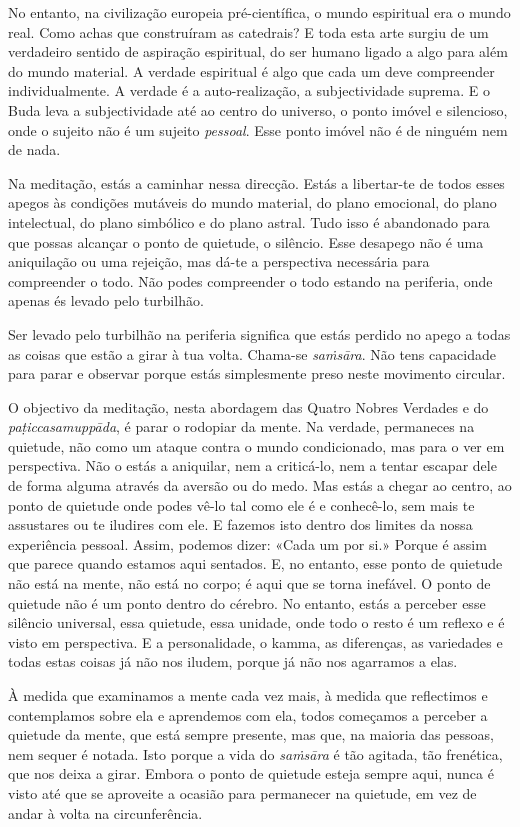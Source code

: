 No entanto, na civilização europeia pré-científica, o mundo espiritual era o
mundo real. Como achas que construíram as catedrais? E toda esta arte surgiu de
um verdadeiro sentido de aspiração espiritual, do ser humano ligado a algo para
além do mundo material. A verdade espiritual é algo que cada um deve compreender
individualmente. A verdade é a auto-realização, a subjectividade suprema. E o
Buda leva a subjectividade até ao centro do universo, o ponto imóvel e
silencioso, onde o sujeito não é um sujeito \emph{pessoal}. Esse ponto imóvel
não é de ninguém nem de nada.

Na meditação, estás a caminhar nessa direcção. Estás a libertar-te de todos
esses apegos às condições mutáveis do mundo material, do plano emocional, do
plano intelectual, do plano simbólico e do plano astral. Tudo isso é abandonado
para que possas alcançar o ponto de quietude, o silêncio. Esse desapego não é
uma aniquilação ou uma rejeição, mas dá-te a perspectiva necessária para
compreender o todo. Não podes compreender o todo estando na periferia, onde
apenas és levado pelo turbilhão.

Ser levado pelo turbilhão na periferia significa que estás perdido no apego a
todas as coisas que estão a girar à tua volta. Chama-se \emph{saṁsāra}. Não
tens capacidade para parar e observar porque estás simplesmente preso neste
movimento circular.

O objectivo da meditação, nesta abordagem das Quatro Nobres Verdades e do
\emph{paṭiccasamuppāda}, é parar o rodopiar da mente. Na verdade, permaneces na
quietude, não como um ataque contra o mundo condicionado, mas para o ver em
perspectiva. Não o estás a aniquilar, nem a criticá-lo, nem a tentar escapar
dele de forma alguma através da aversão ou do medo. Mas estás a chegar ao
centro, ao ponto de quietude onde podes vê-lo tal como ele é e conhecê-lo, sem
mais te assustares ou te iludires com ele. E fazemos isto dentro dos limites da
nossa experiência pessoal. Assim, podemos dizer: «Cada um por si.» Porque é
assim que parece quando estamos aqui sentados. E, no entanto, esse ponto de
quietude não está na mente, não está no corpo; é aqui que se torna inefável. O
ponto de quietude não é um ponto dentro do cérebro. No entanto, estás a perceber
esse silêncio universal, essa quietude, essa unidade, onde todo o resto é um
reflexo e é visto em perspectiva. E a personalidade, o kamma, as diferenças, as
variedades e todas estas coisas já não nos iludem, porque já não nos agarramos a
elas.

À medida que examinamos a mente cada vez mais, à medida que reflectimos e
contemplamos sobre ela e aprendemos com ela, todos começamos a perceber a
quietude da mente, que está sempre presente, mas que, na maioria das pessoas,
nem sequer é notada. Isto porque a vida do \emph{saṁsāra} é tão agitada, tão
frenética, que nos deixa a girar. Embora o ponto de quietude esteja sempre aqui,
nunca é visto até que se aproveite a ocasião para permanecer na quietude, em vez
de andar à volta na circunferência.

